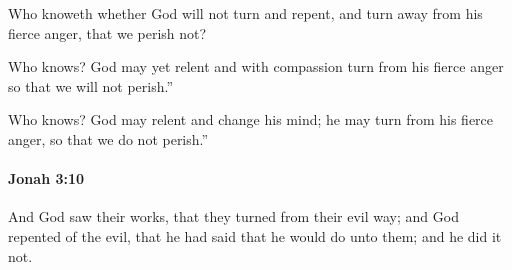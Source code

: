 			\begin{versebox}
					\item[BHS] 
					\item[LXX] 
					\item[ASV] Who knoweth whether God will not turn and repent, and turn away from his fierce anger, that we perish not?
					\item[NIV] Who knows? God may yet relent and with compassion turn from his fierce anger so that we will not perish.”
					\item[NRSV] Who knows? God may relent and change his mind; he may turn from his fierce anger, so that we do not perish.”
			\end{versebox}

		\paragraph{Jonah 3:10} %
			\label{JONAH-3-10}

			And God saw their works, that they turned from their evil way; and God repented of the evil, that he had said that he would do unto them; and he did it not.

